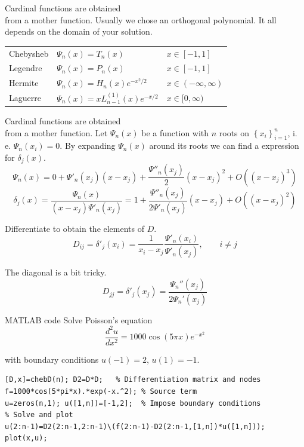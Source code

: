 \documentclass[xcolor={dvipsnames}]{beamer}
\begin{document}
\begin{frame}{Cardinal functions are obtained\\from a mother function.}{}
Usually we chose an orthogonal polynomial. It all depends on the domain of your solution.

\bigskip
\begin{tabular}{lll}
Chebysheb & $\Psi_n(x) = T_n(x)$ & $x\in[-1,1]$\\
Legendre  & $\Psi_n(x) = P_n(x)$ & $x\in[-1,1]$\\
Hermite   & $\Psi_n(x) = H_n(x)e^{-x^2/2}$ & $x\in(-\infty,\infty)$\\
Laguerre  & $\Psi_n(x) = xL_{n-1}^{(1)}(x)e^{-x/2}$ & $x\in[0,\infty)$\\
\end{tabular}
\end{frame}

\begin{frame}{Cardinal functions are obtained\\from a mother function.}{}
Let $\Psi_n(x)$ be a function with $n$ roots on $\left\{x_i\right\}_{i=1}^n$, i. e. $\Psi_n(x_i)=0$.  By expanding $\Psi_n(x)$ around its roots we can find a expression for $\delta_j(x)$.
\pause
\begin{equation*}
\Psi_n(x)=0+\Psi'_n(x_j)(x-x_j)+\frac{\Psi''_n(x_j)}{2}(x-x_j)^2+O((x-x_j)^3)
\end{equation*}
\pause
\begin{equation*}
\delta_j(x)=\frac{\Psi_n(x)}{(x-x_j)\Psi'_n(x_j)}=1+\frac{\Psi''_n(x_j)}{2\Psi'_n(x_j)}(x-x_j)+O((x-x_j)^2)
\end{equation*}
\end{frame}


\begin{frame}{Differentiate to obtain the elements of $D$.}{}
\begin{equation*}
D_{ij}=\delta'_j(x_i)=\frac{1}{x_i-x_j}\frac{\Psi'_n(x_i)}{\Psi'_n(x_j)}, \qquad i\neq j
\end{equation*}

\bigskip
The diagonal is a bit tricky.
\begin{equation*}
D_{jj}=\delta'_j(x_j)=\frac{\Psi_n''(x_j)}{2\Psi_n'(x_j)}
\end{equation*}
\end{frame}

\begin{frame}[fragile]{MATLAB code}{}
Solve Poisson's equation
\begin{equation*}
\frac{d^2u}{dx^2}=1000\cos(5\pi x)e^{-x^2}
\end{equation*}

with boundary conditions $u(-1)=2$, $u(1)=-1$.
\pause
\begin{lstlisting}
[D,x]=chebD(n); D2=D*D;   % Differentiation matrix and nodes
f=1000*cos(5*pi*x).*exp(-x.^2); % Source term
u=zeros(n,1); u([1,n])=[-1,2];  % Impose boundary conditions
% Solve and plot
u(2:n-1)=D2(2:n-1,2:n-1)\(f(2:n-1)-D2(2:n-1,[1,n])*u([1,n]));
plot(x,u);
\end{lstlisting}
\end{frame}
\end{document}
